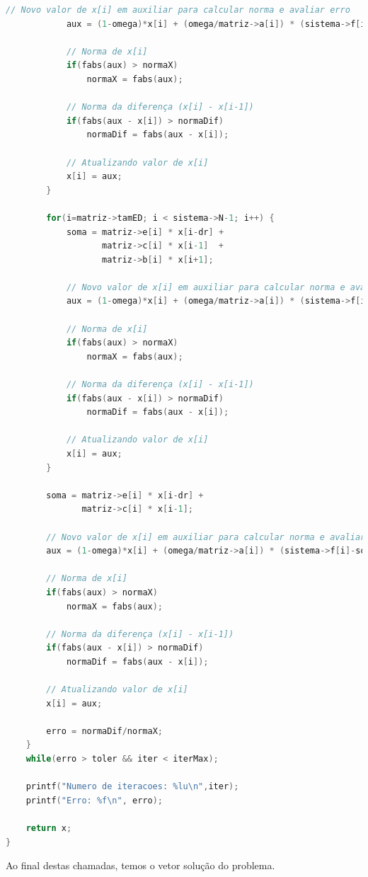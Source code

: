 \documentclass[
	11pt,				%
	oneside,			%
	a4paper,			%
	english,			%
	brazil,				%
	]{article}
\begin{document}
\begin{lstlisting}[language=C, caption=Função SOR normal]
            // Novo valor de x[i] em auxiliar para calcular norma e avaliar erro
            aux = (1-omega)*x[i] + (omega/matriz->a[i]) * (sistema->f[i]-soma);

            // Norma de x[i]
            if(fabs(aux) > normaX)
                normaX = fabs(aux);

            // Norma da diferença (x[i] - x[i-1])
            if(fabs(aux - x[i]) > normaDif)
                normaDif = fabs(aux - x[i]);

            // Atualizando valor de x[i]
            x[i] = aux;
        }

        for(i=matriz->tamED; i < sistema->N-1; i++) {
            soma = matriz->e[i] * x[i-dr] +
                   matriz->c[i] * x[i-1]  +
                   matriz->b[i] * x[i+1];

            // Novo valor de x[i] em auxiliar para calcular norma e avaliar erro
            aux = (1-omega)*x[i] + (omega/matriz->a[i]) * (sistema->f[i]-soma);

            // Norma de x[i]
            if(fabs(aux) > normaX)
                normaX = fabs(aux);

            // Norma da diferença (x[i] - x[i-1])
            if(fabs(aux - x[i]) > normaDif)
                normaDif = fabs(aux - x[i]);

            // Atualizando valor de x[i]
            x[i] = aux;
        }

        soma = matriz->e[i] * x[i-dr] +
               matriz->c[i] * x[i-1];

        // Novo valor de x[i] em auxiliar para calcular norma e avaliar erro
        aux = (1-omega)*x[i] + (omega/matriz->a[i]) * (sistema->f[i]-soma);

        // Norma de x[i]
        if(fabs(aux) > normaX)
            normaX = fabs(aux);

        // Norma da diferença (x[i] - x[i-1])
        if(fabs(aux - x[i]) > normaDif)
            normaDif = fabs(aux - x[i]);

        // Atualizando valor de x[i]
        x[i] = aux;

		erro = normaDif/normaX;
	}
    while(erro > toler && iter < iterMax);

	printf("Numero de iteracoes: %lu\n",iter);
    printf("Erro: %f\n", erro);

	return x;
}
\end{lstlisting}

Ao final destas chamadas, temos o vetor solução do problema.
\end{document}

